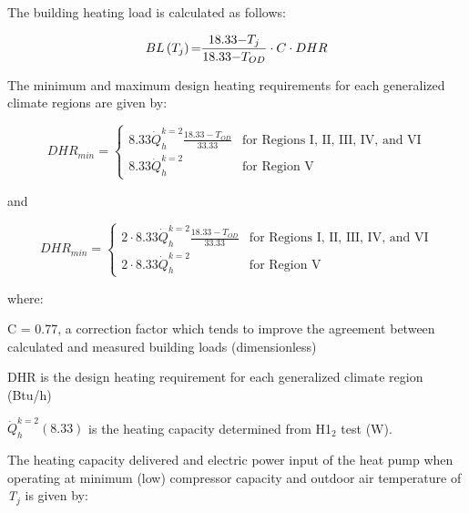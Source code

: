 The building heating load is calculated as follows:

\begin{equation}
BL\left( {{T_j}} \right){\rm{ = }}\frac{{{\rm{18}}{\rm{.33 - }}{T_j}}}{{{\rm{18}}{\rm{.33 - }}{T_{OD}}}} \cdot C \cdot DHR
\end{equation}

The minimum and maximum design heating requirements for each generalized climate regions are given by:

\begin{equation}
DHR_{min} = \left\{  \begin{array}{cl}
                         8.33 \dot{Q}_h^{k = 2} \frac{18.33-T_{OD}}{33.33} & \text{for Regions I, II, III, IV, and VI} \\
                         8.33 \dot{Q}_h^{k = 2} & \text{for Region V}
                     \end{array}
            \right.
\end{equation}

and

\begin{equation}
DHR_{min} = \left\{  \begin{array}{cl}
                         2 \cdot 8.33 \dot{Q}_h^{k = 2} \frac{18.33-T_{OD}}{33.33} & \text{for Regions I, II, III, IV, and VI} \\
                         2 \cdot 8.33 \dot{Q}_h^{k = 2} & \text{for Region V}
                     \end{array}
            \right.
\end{equation}

where:

C = 0.77, a correction factor which tends to improve the agreement between calculated and measured building loads (dimensionless)

DHR is the design heating requirement for each generalized climate region (Btu/h)

\(\dot Q_h^{k = 2}(8.33)\) is the heating capacity determined from H1\(_{2}\) test (W).

The heating capacity delivered and electric power input of the heat pump when operating at minimum (low) compressor capacity and outdoor air temperature of \emph{T\(_{j}\)} is given by:

